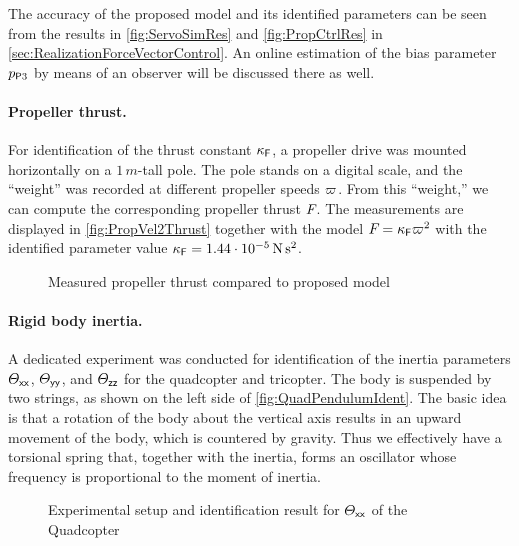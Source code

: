 The accuracy of the proposed model and its identified parameters can be seen from the results in \autoref{fig:ServoSimRes} and \autoref{fig:PropCtrlRes} in \autoref{sec:RealizationForceVectorControl}.
An online estimation of the bias parameter $\PropParam[3]$ by means of an observer will be discussed there as well.

\paragraph*{Propeller thrust.}
For identification of the thrust constant $\kappaF$, a propeller drive was mounted horizontally on a $1\,\unit{m}$-tall pole.
The pole stands on a digital scale, and the ``weight'' was recorded at different propeller speeds $\PropVel$.
From this ``weight,'' we can compute the corresponding propeller thrust $\PropForce$.
The measurements are displayed in \autoref{fig:PropVel2Thrust} together with the model $\PropForce = \kappaF \PropVel^2$ with the identified parameter value $\kappaF = 1.44 \cdot 10^{-5}\,\unit{N}\,\unit{s}^2$.

\begin{figure}
 \centering
 \footnotesize%
 \caption{Measured propeller thrust compared to proposed model}
 \label{fig:PropVel2Thrust}
\end{figure}

\paragraph*{Rigid body inertia.}
A dedicated experiment was conducted for identification of the inertia parameters $\Jxx$, $\Jyy$, and $\Jzz$ for the quadcopter and tricopter.
The body is suspended by two strings, as shown on the left side of \autoref{fig:QuadPendulumIdent}.
The basic idea is that a rotation of the body about the vertical axis results in an upward movement of the body, which is countered by gravity.
Thus we effectively have a torsional spring that, together with the inertia, forms an oscillator whose frequency is proportional to the moment of inertia.

\begin{figure}
 \centering
 
 \hfill
 \footnotesize%
 \caption{Experimental setup and identification result for $\Jxx$ of the Quadcopter}
 \label{fig:QuadPendulumIdent}
\end{figure}

